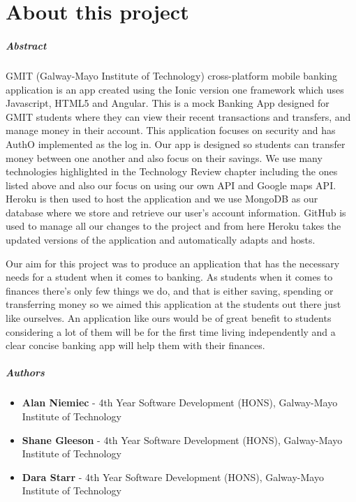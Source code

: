 
\chapter*{About this project}
\paragraph{Abstract}
GMIT (Galway-Mayo Institute of Technology) cross-platform mobile banking application is an app created using the Ionic version one framework which uses Javascript, HTML5 and Angular. This is a mock Banking App designed for GMIT students where they can view their recent transactions and transfers, and manage money in their account. This application focuses on security and has AuthO implemented as the log in. Our app is designed so students can transfer money between one another and also focus on their savings. We use many technologies highlighted in the Technology Review chapter including the ones listed above and also our focus on using our own API and Google maps API. Heroku is then used to host the application and we use MongoDB as our database where we store and retrieve our user's account information. GitHub is used to manage all our changes to the project and from here Heroku takes the updated versions of the application and automatically adapts and hosts.

Our aim for this project was to produce an application that has the necessary needs for a student when it comes to banking. As students when it comes to finances there's only few things we do, and that is either saving, spending or transferring money so we aimed this application at the students out there just like ourselves. An application like ours would be of great benefit to students considering a lot of them will be for the first time living independently and a clear concise banking app will help them with their finances.




\paragraph{Authors}
    \begin{itemize}
    \item \textbf{Alan Niemiec} - 4th Year Software Development (HONS), Galway-Mayo Institute of Technology
    \item \textbf{Shane Gleeson} - 4th Year Software Development (HONS), Galway-Mayo Institute of Technology
    \item \textbf{Dara Starr} - 4th Year Software Development (HONS), Galway-Mayo Institute of Technology
    \end{itemize}



